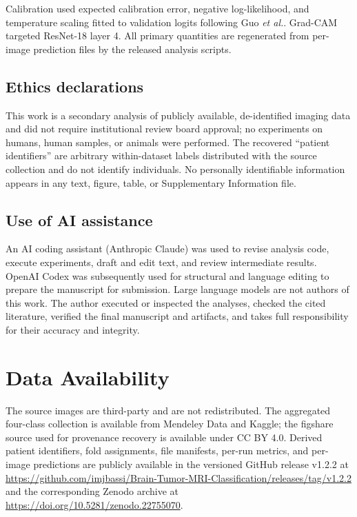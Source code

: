 ﻿\documentclass[twocolumn]{article}
\begin{document}
Calibration used expected calibration error, negative log-likelihood, and temperature scaling fitted to validation logits following Guo \textit{et al.}\cite{guo2017calibration}. Grad-CAM targeted ResNet-18 layer 4\cite{selvaraju2017grad}. All primary quantities are regenerated from per-image prediction files by the released analysis scripts.

\subsection{Ethics declarations}
This work is a secondary analysis of publicly available, de-identified imaging data and did not require institutional review board approval; no experiments on humans, human samples, or animals were performed. The recovered ``patient identifiers'' are arbitrary within-dataset labels distributed with the source collection and do not identify individuals. No personally identifiable information appears in any text, figure, table, or Supplementary Information file.

\subsection{Use of AI assistance}
An AI coding assistant (Anthropic Claude) was used to revise analysis code, execute experiments, draft and edit text, and review intermediate results. OpenAI Codex was subsequently used for structural and language editing to prepare the manuscript for submission. Large language models are not authors of this work. The author executed or inspected the analyses, checked the cited literature, verified the final manuscript and artifacts, and takes full responsibility for their accuracy and integrity.

\section*{Data Availability}
The source images are third-party and are not redistributed. The aggregated four-class collection is available from Mendeley Data\cite{ghaffar2024dataset} and Kaggle\cite{nickparvar2021dataset}; the figshare source used for provenance recovery is available under CC BY 4.0\cite{cheng2015enhanced}. Derived patient identifiers, fold assignments, file manifests, per-run metrics, and per-image predictions are publicly available in the versioned GitHub release v1.2.2 at \url{https://github.com/imjbassi/Brain-Tumor-MRI-Classification/releases/tag/v1.2.2} and the corresponding Zenodo archive at \url{https://doi.org/10.5281/zenodo.22755070}.
\end{document}
